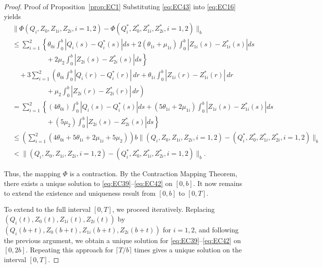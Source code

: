 \begin{proof}{Proof of Proposition~\ref{prop:EC1}}
Substituting \eqref{eq:EC43} into \eqref{eq:EC16} yields
\begin{align}
&\| \Phi(Q_i, Z_0, Z_{1i}, Z_{2i}, i=1,2) - \Phi(Q_i^*, Z^*_0, Z^*_{1i}, Z^*_{2i}, i=1,2) \|_b \nonumber \\
&\le \sum_{i=1}^{2}\left\{\theta_{0i} \int_0^b |Q_i(s) - Q_i^*(s)|ds + 2(\theta_{1i} + \mu_{1i}) \int_0^b |Z_{1i}(s) - Z^*_{1i}(s)|ds \right. \nonumber \\
&\quad\quad\quad\quad\quad + \left. 2\mu_2 \int_0^b |Z_{2i}(s) - Z^*_{2i}(s)|ds\right\} \nonumber \\
&\quad + 3 \sum_{i=1}^{2}\left(\theta_{0i} \int_0^b |Q_i(r) - Q_i^*(r)| \, dr + \theta_{1i} \int_0^b |Z_{1i}(r) - Z_{1i}^*(r)| \, dr \right. \nonumber \\
&\quad\quad\quad\quad\quad + \left. \mu_2 \int_0^b |Z_{2i}(r) - Z_{2i}^*(r)| \, dr\right) \nonumber \\
&= \sum_{i=1}^{2}\left\{(4\theta_{0i}) \int_0^b |Q_i(s) - Q_i^*(s)|ds + (5\theta_{1i} + 2\mu_{1i}) \int_0^b |Z_{1i}(s) - Z^*_{1i}(s)|ds \right. \nonumber \\
&\quad\quad\quad\quad\quad + \left. (5\mu_2) \int_0^b |Z_{2i}(s) - Z^*_{2i}(s)|ds\right\} \nonumber \\
&\le \left(\sum_{i=1}^{2}(4\theta_{0i} + 5\theta_{1i} + 2\mu_{1i} + 5\mu_2)\right)b \|(Q_i, Z_0, Z_{1i}, Z_{2i}, i=1,2) - (Q_i^*, Z^*_0, Z^*_{1i}, Z^*_{2i}, i=1,2)\|_b \nonumber \\
&< \|(Q_i, Z_0, Z_{1i}, Z_{2i}, i=1,2) - (Q_i^*, Z^*_0, Z^*_{1i}, Z^*_{2i}, i=1,2)\|_b.
\end{align}

Thus, the mapping $\Phi$ is a contraction. By the Contraction Mapping Theorem, there exists a unique solution to \eqref{eq:EC39}--\eqref{eq:EC42} on $[0, b]$. It now remains to extend the existence and uniqueness result from $[0, b]$ to $[0, T]$. 

To extend to the full interval $[0, T]$, we proceed iteratively. Replacing $(Q_i(t), Z_0(t), Z_{1i}(t), Z_{2i}(t))$ by $(Q_i(b+t), Z_0(b+t), Z_{1i}(b+t), Z_{2i}(b+t))$ for $i = 1,2$, and following the previous argument, we obtain a unique solution for \eqref{eq:EC39}--\eqref{eq:EC42} on $[0, 2b]$. Repeating this approach for $\lceil T/b \rceil$ times gives a unique solution on the interval $[0, T]$.


\end{proof}

